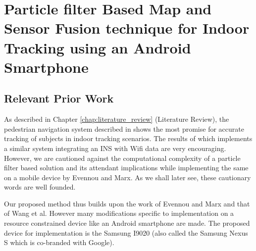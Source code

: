 \chapter[Proposed Work]{Particle filter Based Map and Sensor Fusion technique for Indoor Tracking 
using an Android Smartphone\label{chap:proposed_method}}

\section{Relevant Prior Work}
As described in Chapter \ref{chap:literature_review} (Literature Review),
the pedestrian navigation system described in \cite{Wang} 
shows the most promise for accurate tracking of subjects in indoor tracking scenarios. 
The results of \cite{Evennou} which implements a similar system integrating an INS 
with Wifi data are very encouraging. However, we are cautioned 
against the computational complexity of a particle filter based solution and its attendant
implications while implementing the same on a mobile device by Evennou and Marx\cite{Evennou}. As we shall later
see, these cautionary words are well founded.

Our proposed method thus builds upon the work of Evennou and Marx\cite{Evennou}
and that of Wang et al\cite{Wang}. However many modifications specific to
implementation on a resource constrained device like an Android smartphone are
made. The proposed device for implementation is the Samsung I9020 (also called
the Samsung Nexus S which is co-branded with Google).



